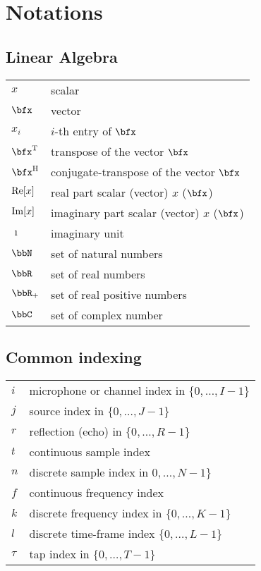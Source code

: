 \chapter*{Notations}


\section*{Linear Algebra}
\begin{table}[H]
    \begin{tabular}{ll}
        $x$     & scalar      \\
        $\bfx$  & vector      \\
        $x_i$   & $i$-th entry of $\bfx$ \\
        $\ktranspose{\bfx}$   & transpose of the vector $\bfx$ \\
        $\khermitian{\bfx}$   & conjugate-transpose of the vector $\bfx$ \\
        $\operatorname{Re}[x]$ & real part scalar (vector) $x$ ($\bfx$) \\
        $\operatorname{Im}[x]$ & imaginary part scalar (vector) $x$ ($\bfx$) \\
        $\imath$     & imaginary unit \\
        $\bbN$    & set of natural numbers \\
        $\bbR$    & set of real numbers \\
        $\bbR_{+}$    & set of real positive numbers \\
        $\bbC$    & set of complex number \\
    \end{tabular}
\end{table}

\section*{Common indexing}
\begin{table}[H]
    \begin{tabular}{ll}
        $i$     & microphone or channel index in $\{0, \dots, I-1\}$      \\
        $j$     & source index in $\{0, \dots, J-1\}$      \\
        $r$     & reflection (echo) in $\{0, \dots, R-1\}$      \\
        $t$     & continuous sample index\\
        $n$     & discrete sample index in $0, \dots, N-1\}$ \\
        $f$     & continuous frequency index \\
        $k$     & discrete frequency index in $\{0, \dots, K-1\}$ \\
        $l$     & discrete time-frame index $\{0, \dots, L-1\}$\\
        $\tau$  & tap index in $\{0, \dots, T-1\}$\\
    \end{tabular}
\end{table}

